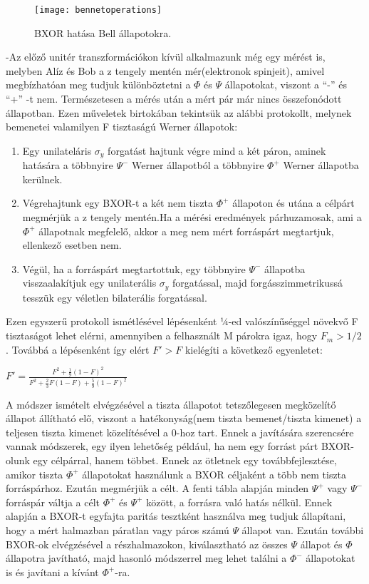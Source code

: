 \begin{figure}[H]
\centering
\texttt{[image: bennetoperations]}
\caption[BXOR hatása Bell állapotokra]{BXOR hatása Bell állapotokra.}
\end{figure}
-Az előző unitér transzformációkon kívül alkalmazunk még egy mérést is, melyben Alíz és Bob a z tengely mentén mér(elektronok spinjeit), amivel megbízhatóan meg tudjuk különböztetni a $\Phi$ és $\Psi$ állapotokat, viszont a ``-'' és ``+'' -t nem. Természetesen a mérés után a mért pár már nincs összefonódott állapotban.
Ezen műveletek birtokában tekintsük az alábbi protokollt, melynek bemenetei valamilyen F tisztaságú Werner állapotok:
\begin{enumerate}
\item Egy unilateláris $\sigma_y$ forgatást hajtunk végre mind a két páron, aminek hatására a többnyire $\Psi^-$ Werner állapotból a többnyire $\Phi^+$ Werner állapotba kerülnek.
\item Végrehajtunk egy  BXOR-t a két nem tiszta $\Phi^+$ állapoton és utána a célpárt megmérjük a z tengely mentén.Ha a mérési eredmények párhuzamosak, ami a $\Phi^+$ állapotnak megfelelő, akkor a meg nem mért forráspárt  megtartjuk, ellenkező esetben nem.
\item Végül, ha a forráspárt megtartottuk, egy többnyire $\Psi^-$ állapotba visszaalakítjuk egy unilaterális $\sigma_y$ forgatással, majd forgásszimmetrikussá tesszük egy véletlen bilaterális forgatással.
\end{enumerate}
Ezen egyszerű protokoll ismétlésével lépésenként ¼-ed valószínűséggel növekvő F tisztaságot lehet elérni, amennyiben a felhasznált M párokra igaz, hogy
$F_m > 1/2$  . Továbbá a lépésenként így elért $F'>F$ kielégíti a következő egyenletet:\\
\begin{center}
$F' = \frac{F^2 + \frac{1}{9}(1-F)^2}{F^2 + \frac{2}{3}F(1-F) + \frac{5}{9}(1-F)^2} $
\end{center}
A módszer ismételt elvégzésével a tiszta állapotot tetszőlegesen megközelítő állapot állítható elő, viszont a hatékonyság(nem tiszta bemenet/tiszta kimenet)  a teljesen tiszta kimenet közelítésével a 0-hoz tart. Ennek a javítására szerencsére vannak módszerek, egy ilyen lehetőség például, ha nem egy forrást párt BXOR-olunk egy célpárral, hanem többet. Ennek az ötletnek egy továbbfejlesztése, amikor tiszta $\Phi^+$  állapotokat használunk a BXOR céljaként a több nem tiszta forráspárhoz. Ezután megmérjük a célt. A fenti tábla alapján minden $\Psi^+$ vagy $\Psi^-$ forráspár váltja a célt $\Phi^+$ és $\Psi^+$ között, a forrásra való hatás nélkül. Ennek alapján a BXOR-t egyfajta paritás tesztként használva meg tudjuk állapítani, hogy a mért halmazban páratlan vagy páros számú $\Psi$ állapot van. Ezután további BXOR-ok elvégzésével a részhalmazokon, kiválasztható az összes $\Psi$ állapot és $\Phi$ állapotra javítható, majd hasonló módszerrel meg lehet találni a $\Phi^-$ állapotokat is és javítani a kívánt $\Phi^+$-ra.\\
